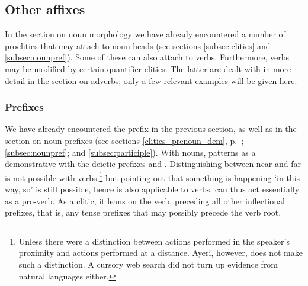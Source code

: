 


\subsection{Other affixes}

In the section on noun morphology we have already encountered a number of
proclitics that may attach to noun heads (see sections
\ref{subsec:clitics} and \ref{subsec:nounpref}). Some of these can also attach
to verbs. Furthermore, verbs may be modified by certain quantifier clitics. The
latter are dealt with in more detail in the section on adverbs; only a few
relevant examples will be given here.

\subsubsection{Prefixes}
\label{subsubsec:verbprefixes}

We have already encountered the prefix  in the
previous section, as well as in the section on noun prefixes (see sections
\ref{clitics_prenoun_dem}, p.~\pageref{clitics_prenoun_dem}; 
\ref{subsec:nounpref}; and \ref{subsec:participle}). With nouns,
 patterns as a demonstrative with the deictic prefixes
 and . Distinguishing between near
and far is not possible with verbs,\footnote{Unless there were a distinction
between actions performed in the speaker's proximity and actions performed at a
distance. Ayeri, however, does not make such a distinction. A cursory web
search did not turn up evidence from natural languages either.} but pointing
out that something is happening `in this way, so' is still possible, hence
 is also applicable to verbs.  can thus act
essentially as a pro-verb. As a clitic, it leans on the verb, preceding all
other inflectional prefixes, that is, any tense prefixes that may possibly
precede the verb root.

